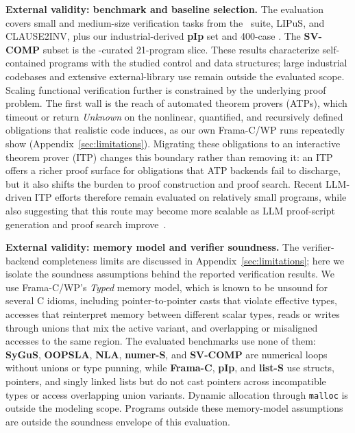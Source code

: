 \smallskip
\noindent\textbf{External validity: benchmark and baseline selection.}
The evaluation covers small and medium-size verification tasks from the \autospec\ suite, LIPuS, and CLAUSE2INV, plus our industrial-derived \textbf{pIp} set and 400-case \textbf{}. The \textbf{SV-COMP} subset is the \autospec-curated 21-program slice. These results characterize self-contained programs with the studied control and data structures; large industrial codebases and extensive external-library use remain outside the evaluated scope. Scaling functional verification further is constrained by the underlying proof problem. The first wall is the reach of automated theorem provers (ATPs), which
timeout or return \emph{Unknown} on the nonlinear, quantified, and recursively
defined obligations that realistic code induces, as our own Frama-C/WP runs
repeatedly show (Appendix~\ref{sec:limitations}). Migrating these obligations to
an interactive theorem prover (ITP) changes this boundary rather than removing
it: an ITP offers a richer proof surface for obligations that ATP backends fail
to discharge, but it also shifts the burden to proof construction and proof
search. Recent LLM-driven ITP efforts therefore remain evaluated on relatively
small programs, while also suggesting that this route may become more scalable
as LLM proof-script generation and proof search improve~\cite{yang2026how,thakur2025clever,ye2026verina,li2026goedelcodeproverhierarchicalproofsearch}.

\smallskip
\noindent\textbf{External validity: memory model and verifier soundness.}
The verifier-backend completeness limits are discussed in
Appendix~\ref{sec:limitations}; here we isolate the soundness assumptions behind
the reported verification results. We use Frama-C/WP's \emph{Typed} memory model,
which is known to be unsound for several C idioms, including pointer-to-pointer
casts that violate effective types, accesses that reinterpret memory between
different scalar types, reads or writes through unions that mix the active
variant, and overlapping or misaligned accesses to the same region. The evaluated
benchmarks use none of them: \textbf{SyGuS}, \textbf{OOPSLA}, \textbf{NLA},
\textbf{numer-S}, and \textbf{SV-COMP} are numerical loops without unions or type
punning, while \textbf{Frama-C}, \textbf{pIp}, and \textbf{list-S} use structs,
pointers, and singly linked lists but do not cast pointers across incompatible
types or access overlapping union variants. Dynamic allocation through
\texttt{malloc} is outside the modeling scope. Programs outside these memory-model
assumptions are outside the soundness envelope of this evaluation.
